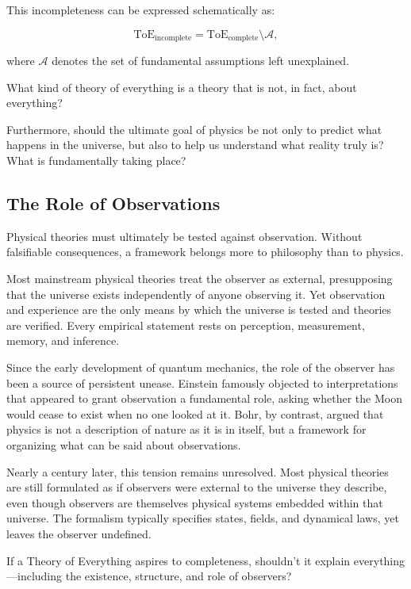This incompleteness can be expressed schematically as:

\[
\text{ToE}_{\text{incomplete}} = \text{ToE}_{\text{complete}} \setminus \mathcal{A},
\]

where $\mathcal{A}$ denotes the set of fundamental assumptions left unexplained.

What kind of theory of everything is a theory that is not, in fact, about everything?

Furthermore, should the ultimate goal of physics be not only to predict what happens in the universe, but also to help us understand what reality truly is? What is fundamentally taking place?



\subsection*{The Role of Observations}

Physical theories must ultimately be tested against observation. Without falsifiable consequences, a framework belongs more to philosophy than to physics.

Most mainstream physical theories treat the observer as external, presupposing that the universe exists independently of anyone observing it. Yet observation and experience are the only means by which the universe is tested and theories are verified. Every empirical statement rests on perception, measurement, memory, and inference.

Since the early development of quantum mechanics, the role of the observer has been a source of persistent unease. Einstein famously objected to interpretations that appeared to grant observation a fundamental role, asking whether the Moon would cease to exist when no one looked at it. Bohr, by contrast, argued that physics is not a description of nature as it is in itself, but a framework for organizing what can be said about observations.

Nearly a century later, this tension remains unresolved. Most physical theories are still formulated as if observers were external to the universe they describe, even though observers are themselves physical systems embedded within that universe. The formalism typically specifies states, fields, and dynamical laws, yet leaves the observer undefined.

If a Theory of Everything aspires to completeness, shouldn't it explain everything—including the existence, structure, and role of observers?



